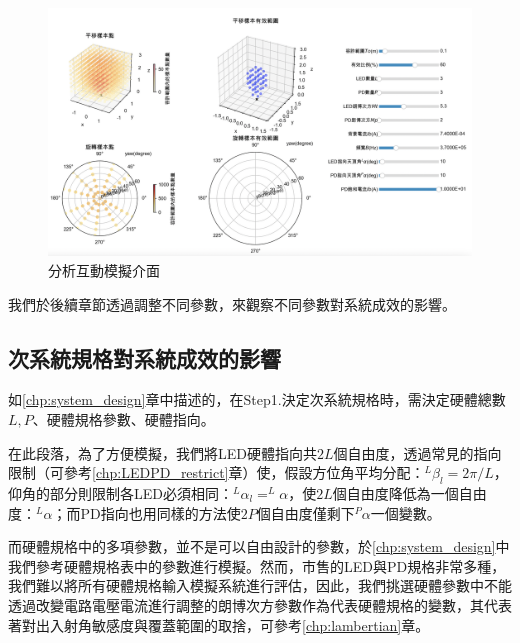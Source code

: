 \begin{figure}[htpb]
    \centering
    \includegraphics[width=15cm]{ch4pic/analysis_interactive.png}
    \caption{分析互動模擬介面}
    \label{pic:analysis_interactive}
\end{figure}

我們於後續章節透過調整不同參數，來觀察不同參數對系統成效的影響。




\subsection{次系統規格對系統成效的影響}
\label{chp:design_result}

如\ref{chp:system_design}章中描述的，在Step1.決定次系統規格時，需決定硬體總數$L,P$、硬體規格參數、硬體指向。

在此段落，為了方便模擬，我們將LED硬體指向共$2L$個自由度，透過常見的指向限制（可參考\ref{chp:LEDPD_restrict}章）使，假設方位角平均分配：$^L\beta_l = 2\pi/L$，仰角的部分則限制各LED必須相同：$^L\alpha_l = ^L\alpha$，使$2L$個自由度降低為一個自由度：$^L\alpha$；而PD指向也用同樣的方法使$2P$個自由度僅剩下$^P\alpha$一個變數。

而硬體規格中的多項參數，並不是可以自由設計的參數，於\ref{chp:system_design}中我們參考硬體規格表中的參數進行模擬。然而，市售的LED與PD規格非常多種，我們難以將所有硬體規格輸入模擬系統進行評估，因此，我們挑選硬體參數中不能透過改變電路電壓電流進行調整的朗博次方參數作為代表硬體規格的變數，其代表著對出入射角敏感度與覆蓋範圍的取捨，可參考\ref{chp:lambertian}章。

